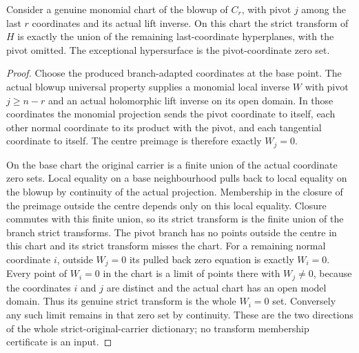 \begin{lemma}
\label{hir:general-nc-highest-stratum-local-strict-branch-drop}
\leanok
Consider a genuine monomial chart of the blowup of $C_r$, with pivot
$j$ among the last $r$ coordinates and its actual lift inverse.
On this chart the strict transform of $H$ is exactly the union of the
remaining last-coordinate hyperplanes, with the pivot omitted. The
exceptional hypersurface is the pivot-coordinate zero set.
\end{lemma}
\begin{proof}
Choose the produced branch-adapted coordinates at the base point.
The actual blowup universal property supplies a monomial local inverse
$W$ with pivot $j\ge n-r$ and an actual holomorphic lift inverse on its
open domain. In those coordinates the monomial projection sends the
pivot coordinate to itself, each other normal coordinate to its
product with the pivot, and each tangential coordinate to itself.
The centre preimage is therefore exactly $W_j=0$.

On the base chart the original carrier is a finite union of the actual
coordinate zero sets. Local equality on a base neighbourhood pulls back
to local equality on the blowup by continuity of the actual projection.
Membership in the closure of the preimage outside the centre depends
only on this local equality. Closure commutes with this finite union,
so its strict transform is the finite union of the branch strict
transforms. The pivot branch has no points outside the centre in this
chart and its strict transform misses the chart. For a remaining normal
coordinate $i$, outside $W_j=0$ its pulled back zero equation is exactly
$W_i=0$. Every point of $W_i=0$ in the chart is a limit of points there
with $W_j\ne0$, because the coordinates $i$ and $j$ are distinct and
the actual chart has an open model domain. Thus its genuine strict
transform is the whole $W_i=0$ set. Conversely any such limit remains
in that zero set by continuity. These are the two directions of the
whole strict-original-carrier dictionary; no transform membership
certificate is an input.
\end{proof}

